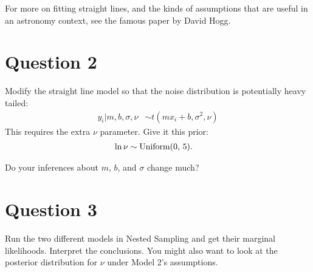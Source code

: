 \documentclass[a4paper, 12pt]{article}
\begin{document}
For more on fitting straight lines, and the kinds of assumptions that are useful
in an astronomy context, see the famous paper by David Hogg.

\section*{Question 2}

Modify the straight line model so that the noise distribution is potentially
heavy tailed:
\begin{align}
y_i | m, b, \sigma, \nu &\sim t(mx_i + b, \sigma^2, \nu)
\end{align}
This requires the extra $\nu$ parameter. Give it this prior:
\begin{align}
\ln \nu &\sim \textnormal{Uniform(0, 5)}.
\end{align}

Do your inferences about $m$, $b$, and $\sigma$ change much?

\section*{Question 3}

Run the two different models in Nested Sampling and get their marginal likelihoods.
Interpret the conclusions. You might also want to look at the posterior distribution
for $\nu$ under Model 2's assumptions.
\end{document}

